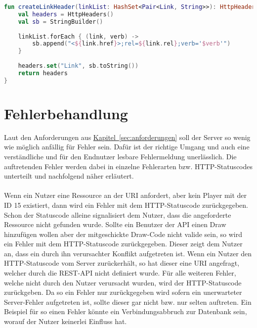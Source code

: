 \begin{lstlisting}[style=lstStyleFramed, language=Kotlin, caption={Implementierung: \enquote{Links zu String} Parse-Funktion}, label=lst:createLinkHeader, float]
fun createLinkHeader(linkList: HashSet<Pair<Link, String>>): HttpHeaders {
	val headers = HttpHeaders()
	val sb = StringBuilder()
	
	linkList.forEach { (link, verb) ->
		sb.append("<${link.href}>;rel=${link.rel};verb='$verb'")
	}
	
	headers.set("Link", sb.toString())
	return headers
}
\end{lstlisting}

\section{Fehlerbehandlung}\label{sec:exceptionsHandling}
Laut den Anforderungen aus \hyperref[sec:anforderungen]{Kapitel~\ref{sec:anforderungen}} soll der Server so wenig wie möglich anfällig für Fehler sein. Dafür ist der richtige Umgang und auch eine verständliche und für den Endnutzer lesbare Fehlermeldung unerlässlich. Die auftretenden Fehler werden dabei in einzelne Fehlerarten bzw. \gls{HTTP}-Statuscodes unterteilt und nachfolgend näher erläutert.\\
\\
Wenn ein Nutzer eine Ressource an der \gls{URI}  anfordert, aber kein Player mit der ID 15 existiert, dann wird ein Fehler mit dem \gls{HTTP}-Statuscode  zurückgegeben. Schon der Statuscode alleine signalisiert dem Nutzer, dass die angeforderte Ressource nicht gefunden wurde. Sollte ein Benutzer der \gls{API} einen Draw hinzufügen wollen aber der mitgeschickte Draw-Code nicht valide sein, so wird ein Fehler mit dem \gls{HTTP}-Statuscode  zurückgegeben. Dieser zeigt dem Nutzer an, dass ein durch ihn verursachter Konflikt aufgetreten ist. Wenn ein Nutzer den \gls{HTTP}-Statuscode  vom Server zurückerhält, so hat dieser eine \gls{URI} angefragt, welcher durch die \gls{REST}-\gls{API} nicht definiert wurde. Für alle weiteren Fehler, welche nicht durch den Nutzer verursacht wurden, wird der \gls{HTTP}-Statuscode  zurückgeben. Da so ein Fehler nur zurückgegeben wird sofern ein unerwarteter Server-Fehler aufgetreten ist, sollte dieser gar nicht bzw. nur selten auftreten. Ein Beispiel für so einen Fehler könnte ein Verbindungsabbruch zur Datenbank sein, worauf der Nutzer keinerlei Einfluss hat.\\
